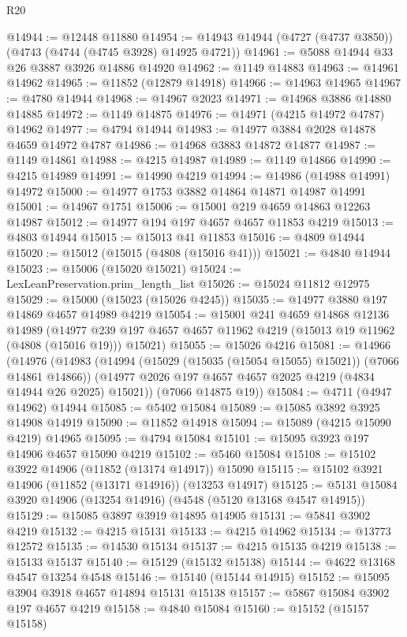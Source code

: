 \begin{lexlean}{R20}
\begin{coremodule}
@14944 := @12448 @11880
@14954 := @14943 @14944 (@4727 (@4737 @3850)) (@4743 (@4744 (@4745 @3928) @14925 @4721))
@14961 := @5088 @14944 @33 @26 @3887 @3926 @14886 @14920
@14962 := @1149 @14883
@14963 := @14961 @14962
@14965 := @11852 (@12879 @14918)
@14966 := @14963 @14965
@14967 := @4780 @14944
@14968 := @14967 @2023
@14971 := @14968 @3886 @14880 @14885
@14972 := @1149 @14875
@14976 := @14971 (@4215 @14972 @4787) @14962
@14977 := @4794 @14944
@14983 := @14977 @3884 @2028 @14878 @4659 @14972 @4787
@14986 := @14968 @3883 @14872 @14877
@14987 := @1149 @14861
@14988 := @4215 @14987
@14989 := @1149 @14866
@14990 := @4215 @14989
@14991 := @14990 @4219
@14994 := @14986 (@14988 @14991) @14972
@15000 := @14977 @1753 @3882 @14864 @14871 @14987 @14991
@15001 := @14967 @1751
@15006 := @15001 @219 @4659 @14863 @12263 @14987
@15012 := @14977 @194 @197 @4657 @4657 @11853 @4219
@15013 := @4803 @14944
@15015 := @15013 @41 @11853
@15016 := @4809 @14944
@15020 := @15012 (@15015 (@4808 (@15016 @41)))
@15021 := @4840 @14944
@15023 := @15006 (@15020 @15021)
@15024 := LexLeanPreservation.prim_length_list
@15026 := @15024 @11812 @12975
@15029 := @15000 (@15023 (@15026 @4245))
@15035 := @14977 @3880 @197 @14869 @4657 @14989 @4219
@15054 := @15001
    @241
    @4659
    @14868
    @12136
    @14989
    (@14977 @239 @197 @4657 @4657 @11962 @4219 (@15013 @19 @11962 (@4808 (@15016 @19))) @15021)
@15055 := @15026 @4216
@15081 := @14966
    (@14976
      (@14983
        (@14994 (@15029 (@15035 (@15054 @15055) @15021)) (@7066 @14861 @14866))
        (@14977 @2026 @197 @4657 @4657 @2025 @4219 (@4834 @14944 @26 @2025) @15021))
      (@7066 @14875 @19))
@15084 := @4711 (@4947 @14962) @14944
@15085 := @5402 @15084
@15089 := @15085 @3892 @3925 @14908 @14919
@15090 := @11852 @14918
@15094 := @15089 (@4215 @15090 @4219) @14965
@15095 := @4794 @15084
@15101 := @15095 @3923 @197 @14906 @4657 @15090 @4219
@15102 := @5460 @15084
@15108 := @15102 @3922 @14906 (@11852 (@13174 @14917)) @15090
@15115 := @15102 @3921 @14906 (@11852 (@13171 @14916)) (@13253 @14917)
@15125 := @5131 @15084 @3920 @14906 (@13254 @14916) (@4548 (@5120 @13168 @4547 @14915))
@15129 := @15085 @3897 @3919 @14895 @14905
@15131 := @5841 @3902 @4219
@15132 := @4215 @15131
@15133 := @4215 @14962
@15134 := @13773 @12572
@15135 := @14530 @15134
@15137 := @4215 @15135 @4219
@15138 := @15133 @15137
@15140 := @15129 (@15132 @15138)
@15144 := @4622 @13168 @4547 @13254 @4548
@15146 := @15140 (@15144 @14915)
@15152 := @15095 @3904 @3918 @4657 @14894 @15131 @15138
@15157 := @5867 @15084 @3902 @197 @4657 @4219
@15158 := @4840 @15084
@15160 := @15152 (@15157 @15158)

\end{coremodule}
\end{lexlean}

